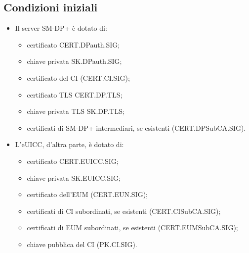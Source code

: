 \documentclass[10pt, twoside, openany]{book}
\begin{document}
\subsection{Condizioni iniziali}
\begin{itemize}
\item Il server SM-DP+ è dotato di:
\begin{itemize}[itemsep=0pt]
\item certificato CERT.DPauth.SIG;
\item chiave privata SK.DPauth.SIG;
\item certificato del CI (CERT.CI.SIG);
\item certificato TLS CERT.DP.TLS;
\item chiave privata TLS SK.DP.TLS;
\item certificati di SM-DP+ intermediari, se esistenti (CERT.DPSubCA.SIG).
\end{itemize}
\item L'eUICC, d'altra parte, è dotato di:
\begin{itemize}[itemsep=0pt]
\item certificato CERT.EUICC.SIG;
\item chiave privata SK.EUICC.SIG;
\item certificato dell'EUM (CERT.EUN.SIG);
\item certificati di CI subordinati, se esistenti (CERT.CISubCA.SIG);
\item certificati di EUM subordinati, se esistenti (CERT.EUMSubCA.SIG);
\item chiave pubblica del CI (PK.CI.SIG).
\end{itemize}
\end{itemize}
\end{document}
